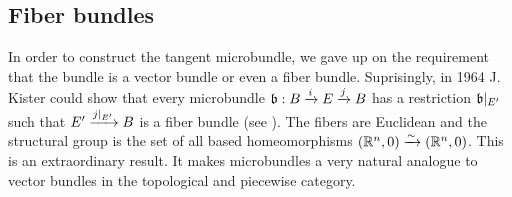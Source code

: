 \subsection*{Fiber bundles}
\begin{myparagraph}
    In order to construct the tangent microbundle, we gave up on the requirement that the bundle is a vector bundle or even a fiber bundle.
    Suprisingly, in 1964 J. Kister could show that every microbundle $\bundledef{\bb}{B}{E}{i}{j}$ has a restriction $\bb[E']$ such that $E' \xrightarrow{j\vert_{E'}} B$ is a fiber bundle (see \cite{kister}).
    The fibers are Euclidean and the structural group is the set of all based homeomorphisms $(\mathbb{R}^n, 0) \xrightarrow{\sim} (\mathbb{R}^n, 0)$.
    This is an extraordinary result. It makes microbundles a very natural analogue to vector bundles in the topological and piecewise category.
\end{myparagraph}